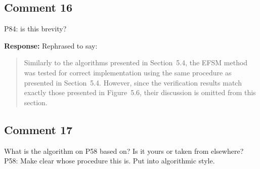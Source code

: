\documentclass[10pt,a4paper,notitlepage]{article}
\numberwithin{equation}{section}
\begin{document}
\subsection{Comment 16}
P84: is this brevity?

\textbf{Response:}
Rephrased to say:
\begin{quote}
Similarly to the algorithms presented in Section~5.4, the EFSM method was tested for correct implementation using the same procedure as presented in Section~5.4. However, since the verification results match exactly those presented in Figure~5.6, their discussion is omitted from this section.
\end{quote}

\subsection{Comment 17}
What is the algorithm on P58 based on? Is it yours or taken from elsewhere? P58: Make clear whose procedure this is. Put into algorithmic style.
\end{document}
